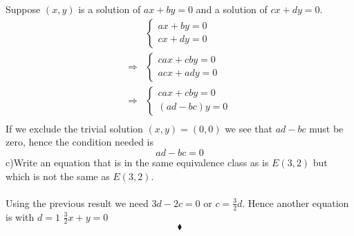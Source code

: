 Suppose $(x,y)$ is a solution of $ax+by=0$ and a solution of $cx+dy=0$. 
\begin{align*}
&\left\{\begin{array}{l}
ax+by=0\\
cx+dy=0
\end{array}\right.\\
\Rightarrow & \left\{\begin{array}{l}
cax+cby=0\\
acx+ady=0
\end{array}\right.\\
\Rightarrow & \left\{\begin{array}{l}
cax+cby=0\\
(ad-bc)y=0
\end{array}\right.\\
\end{align*}
If we exclude the trivial solution $(x,y)= (0,0)$ we see that $ad-bc$ must be zero, hence the condition needed is 
$$ad-bc=0$$
c)Write an equation that is in the same equivalence class as is $E(3, 2)$ but which is not the same as $E(3, 2)$.\\\\
Using the previous result we need $3d-2c=0$ or $c = \frac{3}{2}d$. Hence another equation is with $d=1$  $\frac{3}{2}x+y=0$
$$\blacklozenge$$

